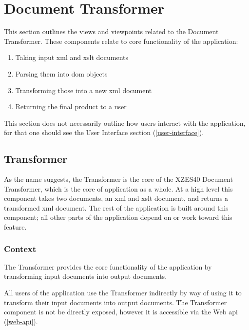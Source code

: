\section{Document Transformer}
\label{document-transformer}

This section outlines the views and viewpoints related to the Document Transformer.
These components relate to core functionality of the application:

\begin{enumerate}
\item Taking input \gls{xml} and \gls{xslt} documents
\item Parsing them into \gls{dom} objects
\item Transforming those into a new \gls{xml} document
\item Returning the final product to a user
\end{enumerate}

This section does not necessarily outline how users interact with the application, for that one should see the User Interface section (\ref{user-interface}).

\subsection{Transformer}
\label{transformer}

As the name suggests, the Transformer is the core of the XZES40 Document Transformer, which is the core of application as a whole.
At a high level this component takes two documents, an \gls{xml} and \gls{xslt} document, and returns a transformed \gls{xml} document.
The rest of the application is built around this component; all other parts of the application depend on or work toward this feature.

\subsubsection{Context}

The Transformer provides the core functionality of the application by transforming input documents into output documents.

All users of the application use the Transformer indirectly by way of using it to transform their input documents into output documents.
The Transformer component is not be directly exposed, however it is accessible via the Web \gls{api} (\ref{web-api}).

